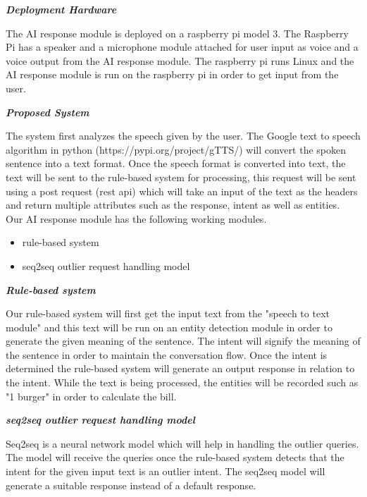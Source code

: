 \documentclass[conference]{IEEEtran}
\begin{document}
\textbf{\textit{Deployment Hardware}}

The AI response module is deployed on a raspberry pi model 3. The Raspberry Pi has a speaker and a microphone module attached for user input as voice and a voice output from the AI response module. The raspberry pi runs Linux and the AI response module is run on the raspberry pi in order to get input from the user. 

\textbf{\textit{Proposed System}}

The system first analyzes the speech given by the user. The Google text to speech algorithm in python (https://pypi.org/project/gTTS/) will convert the spoken sentence into a text format. Once the speech format is converted into text, the text will be sent to the rule-based system for processing, this request will be sent using a post request (rest api) which will take an input of the text as the headers and return multiple attributes such as the response, intent as well as entities. \\

Our AI response module has the following working modules.
\begin{itemize}
	\item rule-based system
	\item seq2seq outlier request handling model
\end{itemize}
\bigskip
\textbf{\textit{Rule-based system}}

Our rule-based system will first get the input text from the "speech to text module" and this text will be run on an entity detection module in order to generate the given meaning of the sentence. The intent will signify the meaning of the sentence in order to maintain the conversation flow. Once the intent is determined the rule-based system will generate an output response in relation to the intent. While the text is being processed, the entities will be recorded such as "1 burger" in order to calculate the bill.

\bigskip

\textbf{\textit{seq2seq outlier request handling model\cite{b5}}}

Seq2seq is a neural network model\cite{b5} which will help in handling the outlier queries. The model will receive the queries once the rule-based system detects that the intent for the given input text is an outlier intent. The seq2seq model will generate a suitable response instead of a default response.

\bigskip
\end{document}
